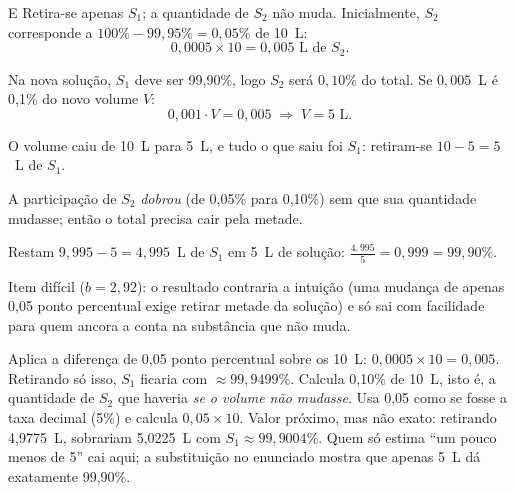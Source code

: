 \begin{resolucao}{E}
 Retira-se apenas $S_1$; a quantidade de $S_2$ não muda.
Inicialmente, $S_2$ corresponde a $100\% - 99{,}95\% = 0{,}05\%$ de 10~L:
\[ 0{,}0005\times 10 = 0{,}005 \text{ L de } S_2. \]

 Na nova solução, $S_1$ deve ser 99,90\%, logo $S_2$
será $0{,}10\%$ do total. Se $0{,}005$~L é 0,1\% do novo volume $V$:
\[ 0{,}001\cdot V = 0{,}005 \;\Rightarrow\; V = 5 \text{ L}. \]

 O volume caiu de 10~L para 5~L, e tudo o que saiu foi
$S_1$: retiram-se $10 - 5 = 5$~L de $S_1$.

 A participação de $S_2$ \emph{dobrou} (de 0,05\% para
0,10\%) sem que sua quantidade mudasse; então o total precisa cair pela metade.

 Restam $9{,}995 - 5 = 4{,}995$~L de $S_1$ em 5~L de
solução: $\frac{4{,}995}{5} = 0{,}999 = 99{,}90\%$.


Item difícil ($b = 2{,}92$): o resultado contraria a intuição (uma mudança de
apenas 0,05 ponto percentual exige retirar metade da solução) e só sai com
facilidade para quem ancora a conta na substância que não muda.
\begin{distratores}
 Aplica a diferença de 0,05 ponto percentual sobre os 10~L:
$0{,}0005\times 10 = 0{,}005$. Retirando só isso, $S_1$ ficaria com
$\approx 99{,}9499\%$.
 Calcula 0,10\% de 10~L, isto é, a quantidade de $S_2$ que haveria
\emph{se o volume não mudasse}.
 Usa 0,05 como se fosse a taxa decimal (5\%) e calcula $0{,}05\times 10$.
 Valor próximo, mas não exato: retirando 4,9775~L, sobrariam 5,0225~L
com $S_1 \approx 99{,}9004\%$. Quem só estima ``um pouco menos de 5'' cai aqui; a
substituição no enunciado mostra que apenas 5~L dá exatamente 99,90\%.
\end{distratores}
\end{resolucao}

